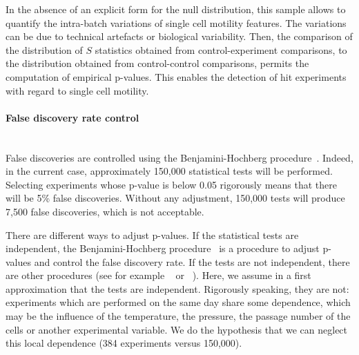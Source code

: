 In the absence of an explicit form for the null distribution, this sample allows to quantify the intra-batch variations of single cell motility features. The variations can be due to technical artefacts or biological variability. Then, the comparison of the distribution of $S$ statistics obtained from control-experiment comparisons, to the distribution obtained from control-control comparisons, permits the computation of empirical p-values. This enables the detection of hit experiments with regard to single cell motility.  

\paragraph{False discovery rate control}~\\
\label{sec:fdr}
False discoveries are controlled using the Benjamini-Hochberg procedure~\cite{Benjamini1}. Indeed, in the current case, approximately 150,000 statistical tests will be performed. Selecting experiments whose p-value is below 0.05 rigorously means that there will be 5\% false discoveries. Without any adjustment, 150,000 tests will produce 7,500 false discoveries, which is not acceptable. 

There are different ways to adjust p-values. If the statistical tests are independent, the Benjamini-Hochberg procedure~\cite{Benjamini1} is a procedure to adjust p-values and control the false discovery rate. If the tests are not independent, there are other procedures (see for example ~\cite{Benjamini2} or ~\cite{Roquain}). Here, we assume in a first approximation that the tests are independent. Rigorously speaking, they are not: experiments which are performed on the same day share some dependence, which may be the influence of the temperature, the pressure, the passage number of the cells or another experimental variable. We do the hypothesis that we can neglect this local dependence (384 experiments versus 150,000).


